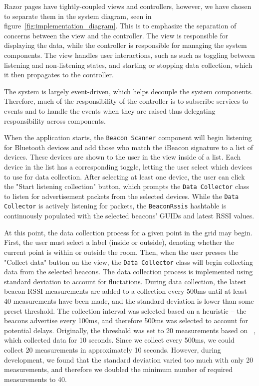 Razor pages have tightly-coupled views and controllers, however, we have chosen to separate them in the system diagram, seen in figure~\ref{fig:implementation_diagram}. This is to emphasize the separation of concerns between the view and the controller. The view is responsible for displaying the data, while the controller is responsible for managing the system components. The view handles user interactions, such as such as toggling between listening and non-listening states, and starting or stopping data collection, which it then propagates to the controller.

The system is largely event-driven, which helps decouple the system components. 
Therefore, much of the responsibility of the controller is to subscribe services to events and to handle the events when they are raised thus delegating responsibility across components. 

When the application starts, the \texttt{Beacon Scanner} component will begin listening for Bluetooth devices and add those who match the iBeacon signature to a list of devices.
These devices are shown to the user in the view inside of a list.
Each device in the list has a corresponding toggle, letting the user select which devices to use for data collection.
After selecting at least one device, the user can click the "Start listening collection" button, which prompts the \texttt{Data Collector} class to listen for advertisement packets from the selected devices. 
While the \texttt{Data Collector} is actively listening for packets, the \texttt{BeaconRssis} hashtable is continuously populated with the selected beacons' GUIDs and latest RSSI values.


At this point, the data collection process for a given point in the grid may begin.
First, the user must select a label (inside or outside), denoting whether the current point is within or outside the room.
Then, when the user presses the "Collect data" button on the view, the \texttt{Data Collector} class will begin collecting data from the selected beacons.
The data collection process is implemented using standard deviation to account for fluctations.
During data collection, the latest beacon RSSI measurements are added to a collection every 500ms until at least 40 measurements have been made, and the standard deviation is lower than some preset threshold.
The collection interval was selected based on a heuristic -- the beacons advertise every 100ms, and therefore 500ms was selected to account for potential delays.
Originally, the threshold was set to 20 measurements based on \citeauthor{improving_indoor_localization}~\cite{improving_indoor_localization}, which collected data for 10 seconds.
Since we collect every 500ms, we could collect 20 measurements in approximately 10 seconds. However, during development, we found that the standard deviation varied too much with only 20 measurements, and therefore we doubled the minimum number of required measurements to 40.

